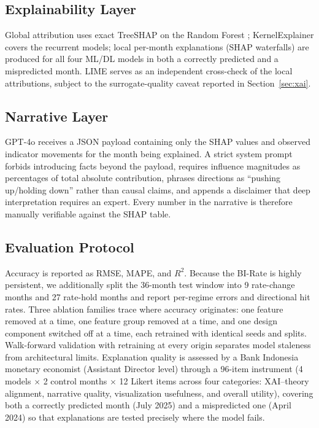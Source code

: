 \documentclass[conference]{IEEEtran}
\begin{document}
\subsection{Explainability Layer}
Global attribution uses exact TreeSHAP on the Random Forest \cite{lundberg2017}; KernelExplainer covers the recurrent models; local per-month explanations (SHAP waterfalls) are produced for all four ML/DL models in both a correctly predicted and a mispredicted month. LIME \cite{ribeiro2016} serves as an independent cross-check of the local attributions, subject to the surrogate-quality caveat reported in Section~\ref{sec:xai}.

\subsection{Narrative Layer}
GPT-4o receives a JSON payload containing only the SHAP values and observed indicator movements for the month being explained. A strict system prompt forbids introducing facts beyond the payload, requires influence magnitudes as percentages of total absolute contribution, phrases directions as ``pushing up/holding down'' rather than causal claims, and appends a disclaimer that deep interpretation requires an expert. Every number in the narrative is therefore manually verifiable against the SHAP table.

\subsection{Evaluation Protocol}
Accuracy is reported as RMSE, MAPE, and $R^2$. Because the BI-Rate is highly persistent, we additionally split the 36-month test window into 9 rate-change months and 27 rate-hold months and report per-regime errors and directional hit rates. Three ablation families trace where accuracy originates: one feature removed at a time, one feature group removed at a time, and one design component switched off at a time, each retrained with identical seeds and splits. Walk-forward validation with retraining at every origin separates model staleness from architectural limits. Explanation quality is assessed by a Bank Indonesia monetary economist (Assistant Director level) through a 96-item instrument (4 models $\times$ 2 control months $\times$ 12 Likert items across four categories: XAI--theory alignment, narrative quality, visualization usefulness, and overall utility), covering both a correctly predicted month (July 2025) and a mispredicted one (April 2024) so that explanations are tested precisely where the model fails.
\end{document}
